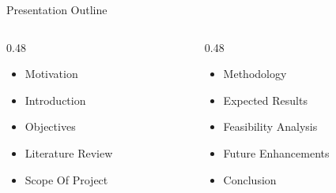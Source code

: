 \begin{frame}{Presentation Outline}
    \begin{columns}[t, onlytextwidth]
        \begin{column}{0.48\textwidth}
            \begin{itemize}
                \item Motivation
                \item Introduction
                \item Objectives
                \item Literature Review
                \item Scope Of Project
            \end{itemize}
        \end{column}
        \begin{column}{0.48\textwidth}
            \begin{itemize}
                \item Methodology
                \item Expected Results
                \item Feasibility Analysis
                \item Future Enhancements
                \item Conclusion
            \end{itemize}
        \end{column}
    \end{columns}
\end{frame}